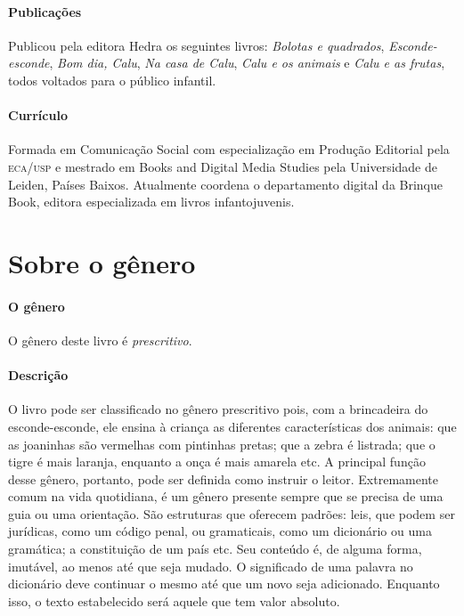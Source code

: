\documentclass[11pt]{extarticle}
\begin{document}
\paragraph{Publicações}
Publicou pela editora Hedra os seguintes livros: \emph{Bolotas e quadrados},
\emph{Esconde-esconde}, \emph{Bom dia, Calu}, \emph{Na casa de Calu}, \emph{Calu e os animais} e
\emph{Calu e as frutas}, todos voltados para o público infantil.

\paragraph{Currículo} 
Formada em Comunicação Social com 
especialização em Produção Editorial pela \textsc{eca/usp} 
e mestrado em Books and Digital Media Studies pela 
Universidade de Leiden, Países Baixos.
Atualmente coordena o departamento digital da Brinque 
Book, editora especializada em livros infantojuvenis.


\section{Sobre o gênero}

\paragraph{O gênero} O gênero deste livro é \textit{prescritivo}. 


\paragraph{Descrição} O livro pode ser classificado no gênero prescritivo pois, com a brincadeira do esconde-esconde, ele ensina à criança as diferentes características dos animais: que as joaninhas são vermelhas com pintinhas pretas; que a zebra é listrada; que o tigre é mais laranja, enquanto a onça é mais amarela etc. A principal função desse gênero, portanto, pode ser definida como instruir o leitor.
Extremamente comum na vida quotidiana, é um gênero presente
sempre que se precisa de uma guia ou uma orientação. São estruturas 
que oferecem padrões: leis, que podem ser jurídicas, como um código
penal, ou gramaticais, como um dicionário ou uma gramática; a constituição
de um país etc. Seu conteúdo é, de alguma forma, imutável, ao menos até que seja
mudado. O significado de uma palavra no dicionário deve continuar o mesmo
até que um novo seja adicionado. Enquanto isso, o texto
estabelecido será aquele que tem valor absoluto.
\end{document}
